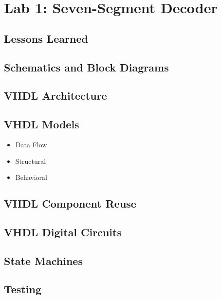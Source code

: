 \chapter{Lab 1: Seven-Segment Decoder \\
\label{Introduction}}


\section{Lessons Learned
\label{Section::Lessons Learned}}
 \section{Schematics and Block Diagrams}
 \section{VHDL Architecture}
 \section{VHDL Models}
 \begin{itemize}
     \item Data Flow
     \item Structural
     \item Behavioral
\end{itemize}
 \section{VHDL Component Reuse}
 \section{VHDL Digital Circuits}
 \section{State Machines}
 \section{Testing}
